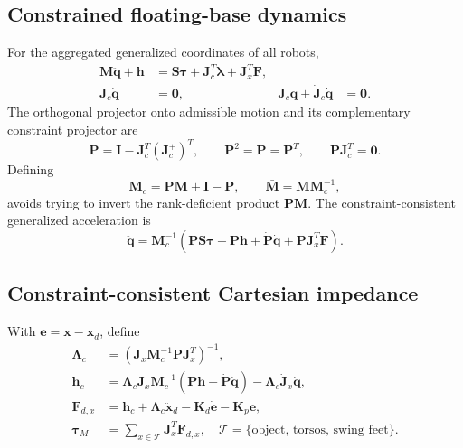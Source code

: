 \documentclass[11pt]{article}
\newcommand{\vect}[1]{\bm{#1}}
\newcommand{\pinv}{^{+}}
\begin{document}
\subsection*{Constrained floating-base dynamics}
For the aggregated generalized coordinates of all robots,
\begin{align}
\vect M\ddot{\vect q}+\vect h
&=\vect S\vect\tau+\vect J_c^T\vect\lambda
+\vect J_x^T\vect F, \tag{PIDC-01}\\
\vect J_c\dot{\vect q}&=\vect0,
&\vect J_c\ddot{\vect q}+\dot{\vect J}_c\dot{\vect q}&=\vect0. \tag{PIDC-02}
\end{align}
The orthogonal projector onto admissible motion and its complementary
constraint projector are
\begin{equation}
\vect P=\vect I-\vect J_c^T(\vect J_c\pinv)^T,\qquad
\vect P^2=\vect P=\vect P^T,\qquad
\vect P\vect J_c^T=\vect0.
\tag{PIDC-03}
\end{equation}
Defining
\begin{equation}
\vect M_c=\vect P\vect M+\vect I-\vect P,\qquad
\bar{\vect M}=\vect M\vect M_c^{-1},
\tag{PIDC-04}
\end{equation}
avoids trying to invert the rank-deficient product $\vect P\vect M$. The
constraint-consistent generalized acceleration is
\begin{equation}
\ddot{\vect q}=\vect M_c^{-1}
\left(\vect P\vect S\vect\tau-\vect P\vect h
+\dot{\vect P}\dot{\vect q}+\vect P\vect J_x^T\vect F\right).
\tag{PIDC-05}
\end{equation}

\subsection*{Constraint-consistent Cartesian impedance}
With $\vect e=\vect x-\vect x_d$, define
\begin{align}
\vect\Lambda_c
&=(\vect J_x\vect M_c^{-1}\vect P\vect J_x^T)^{-1}, \tag{PIDC-06a}\\
\vect h_c
&=\vect\Lambda_c\vect J_x\vect M_c^{-1}
(\vect P\vect h-\dot{\vect P}\dot{\vect q})
-\vect\Lambda_c\dot{\vect J}_x\dot{\vect q}, \tag{PIDC-06b}\\
\vect F_{d,x}
&=\vect h_c+\vect\Lambda_c\ddot{\vect x}_d
-\vect K_d\dot{\vect e}-\vect K_p\vect e, \tag{PIDC-07}\\
\vect\tau_M&=\sum_{x\in\mathcal T}\vect J_x^T\vect F_{d,x},
\quad
\mathcal T=\{\text{object, torsos, swing feet}\}. \tag{PIDC-08}
\end{align}
\end{document}

